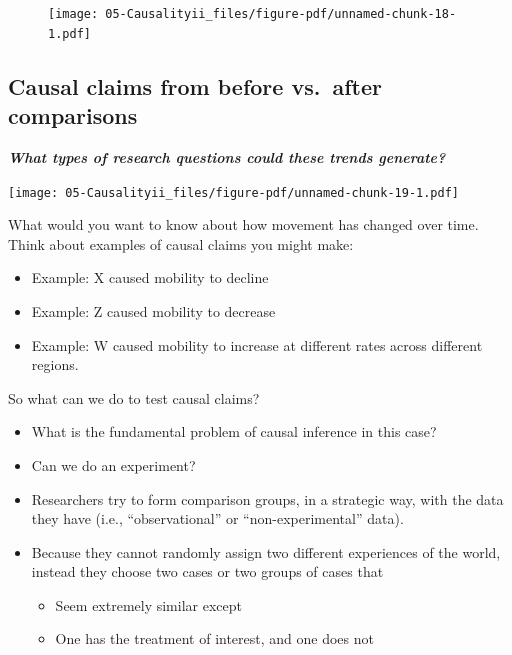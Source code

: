 \documentclass[
  letterpaper,
  DIV=11,
  numbers=noendperiod]{scrreprt}
\providecommand{\tightlist}{%
  \setlength{\itemsep}{0pt}\setlength{\parskip}{0pt}}\usepackage{longtable,booktabs,array}
\begin{document}
\begin{figure}[H]

{\centering \texttt{[image: 05-Causalityii\_files/figure-pdf/unnamed-chunk-18-1.pdf]}

}

\end{figure}

\hypertarget{causal-claims-from-before-vs.-after-comparisons}{%
\subsection{Causal claims from before vs.~after
comparisons}\label{causal-claims-from-before-vs.-after-comparisons}}

\textbf{\emph{What types of research questions could these trends
generate?}}

\texttt{[image: 05-Causalityii\_files/figure-pdf/unnamed-chunk-19-1.pdf]}

What would you want to know about how movement has changed over time.
Think about examples of causal claims you might make:

\begin{itemize}
\tightlist
\item
  Example: X caused mobility to decline
\item
  Example: Z caused mobility to decrease
\item
  Example: W caused mobility to increase at different rates across
  different regions.
\end{itemize}

So what can we do to test causal claims?

\begin{itemize}
\tightlist
\item
  What is the fundamental problem of causal inference in this case?
\item
  Can we do an experiment?
\item
  Researchers try to form comparison groups, in a strategic way, with
  the data they have (i.e., ``observational'' or ``non-experimental''
  data).
\item
  Because they cannot randomly assign two different experiences of the
  world, instead they choose two cases or two groups of cases that

  \begin{itemize}
  \tightlist
  \item
    Seem extremely similar except
  \item
    One has the treatment of interest, and one does not
  \end{itemize}
\end{itemize}
\end{document}
